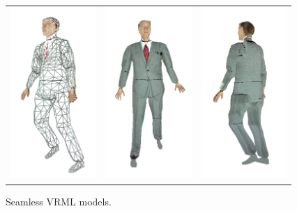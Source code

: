 \documentclass[10pt,oneside,fleqn,a4paper]{book}
\begin{document}
\begin{figure}
\begin{center}
\begin{tabular}{ccc}
\includegraphics[height=6.5cm]{../images/unknown_wireframe} & \includegraphics[height=6.5cm]{../images/unknown_1} & \includegraphics[height=6.5cm]{../images/unknown_2} \\
\end{tabular}
\end{center}
\caption[Seamless VRML models]{\label{fig:seamlessmodels}Seamless VRML models.}
\end{figure}

\end{document}

